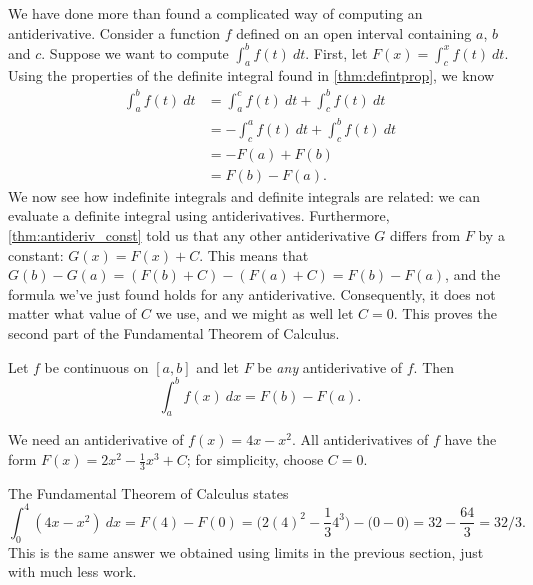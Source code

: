 We have done more than found a complicated way of computing an antiderivative. Consider a function $f$ defined on an open interval containing $a$, $b$ and $c$. Suppose we want to compute $\int_a^b f(t)\ dt$. First, let $F(x) = \int_c^x f(t)\ dt$. Using the properties of the definite integral found in \autoref{thm:defintprop}, we know 
\begin{align*}
	\int_a^b f(t)\ dt
	&= \int_a^c f(t)\ dt + \int_c^b f(t)\ dt \\
	&= -\int_c^a f(t)\ dt + \int_c^b f(t)\ dt \\
	&=-F(a) + F(b)\\
	&= F(b) - F(a).
\end{align*}
We now see how indefinite integrals and definite integrals are related: we can evaluate a definite integral using antiderivatives.  Furthermore, \autoref{thm:antideriv_const} told us that any other antiderivative $G$ differs from $F$ by a constant: $G(x)=F(x)+C$.  This means that $G(b)-G(a)=(F(b)+C)-(F(a)+C)=F(b)-F(a)$, and the formula we've just found holds for any antiderivative.  Consequently, it does not matter what value of $C$ we use, and we might as well let $C=0$. This proves the second part of the Fundamental Theorem of Calculus.

{Let $f$ be continuous on $[a,b]$ and let $F$ be \textit{any} antiderivative of $f$. Then \[\int_a^b f(x)\ dx = F(b) - F(a).\]}



{We need an antiderivative of $f(x)=4x-x^2$. All antiderivatives of $f$ have the form $F(x) = 2x^2-\frac13x^3+C$; for simplicity, choose $C=0$.

The Fundamental Theorem of Calculus states
\[
\int_0^4(4x-x^2)\ dx = F(4)-F(0)
= \big(2(4)^2-\frac134^3\big)-\big(0-0\big) = 32-\frac{64}3 = 32/3.
\]
This is the same answer we obtained using limits in the previous section, just with much less work.}

